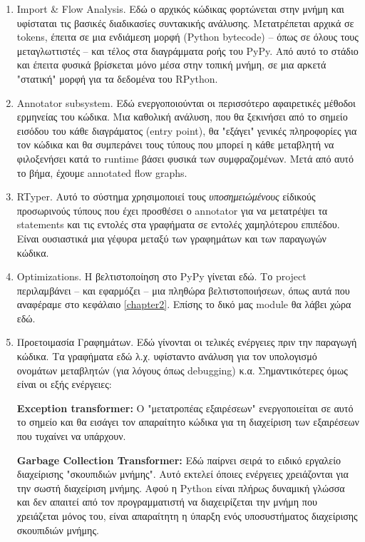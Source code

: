 \begin{enumerate}

\item Import \& Flow Analysis. Εδώ ο αρχικός κώδικας φορτώνεται στην μνήμη και
υφίσταται τις βασικές διαδικασίες συντακικής ανάλυσης. Μετατρέπεται αρχικά σε
tokens, έπειτα σε μια ενδιάμεση μορφή (Python bytecode) – όπως σε όλους τους
μεταγλωττιστές – και τέλος στα διαγράμματα ροής του PyPy. Από αυτό το στάδιο και
έπειτα φυσικά βρίσκεται μόνο μέσα στην τοπική μνήμη, σε μια αρκετά "στατική"
μορφή για τα δεδομένα του RPython.

\item Annotator subsystem. Εδώ ενεργοποιούνται οι περισσότερο αφαιρετικές
μέθοδοι ερμηνείας του κώδικα. Μια καθολική ανάλυση, που θα ξεκινήσει από το
σημείο εισόδου του κάθε διαγράματος (entry point), θα "εξάγει" γενικές
πληροφορίες για τον κώδικα και θα συμπεράνει τους τύπους που μπορεί η κάθε
μεταβλητή να φιλοξενήσει κατά το runtime βάσει φυσικά των συμφραζομένων. Μετά
από αυτό το βήμα, έχουμε annotated flow graphs.

\item RTyper. Αυτό το σύστημα χρησιμοποιεί τους \textit{υποσημειώμένους}
είδικούς προσωρινούς τύπους που έχει προσθέσει ο annotator για να μετατρέψει τα
statements και τις εντολές στα γραφήματα σε εντολές χαμηλότερου επιπέδου. Είναι
ουσιαστικά μια γέφυρα μεταξύ των γραφημάτων και των παραγωγών κώδικα.

\item Optimizations. Η βελτιστοποίηση στο PyPy γίνεται εδώ. Το project
περιλαμβάνει – και εφαρμόζει –  μια πληθώρα βελτιστοποιήσεων, όπως αυτά που
αναφέραμε στο κεφάλαιο \ref{chapter2}. Επίσης το δικό μας module θα λάβει χώρα
εδώ.

\item Προετοιμασία Γραφημάτων. Εδώ γίνονται οι τελικές ενέργειες πριν την
παραγωγή κώδικα. Τα γραφήματα εδώ λ.χ. υφίσταντο ανάλυση για τον υπολογισμό
ονομάτων μεταβλητών (για λόγους όπως debugging) κ.α. Σημαντικότερες όμως είναι
οι εξής ενέργειες:

\textbf{Exception transformer:} Ο "μετατροπέας εξαιρέσεων" ενεργοποιείται σε
αυτό το σημείο και θα εισάγει τον απαραίτητο κώδικα για τη διαχείριση των
εξαιρέσεων που τυχαίνει να υπάρχουν.

\textbf{Garbage Collection Transformer:} Εδώ παίρνει σειρά το ειδικό εργαλείο
διαχείρισης "σκουπιδιών μνήμης". Αυτό εκτελεί όποιες ενέργειες χρειάζονται για
την σωστή διαχείριση μνήμης. Αφού η Python είναι πλήρως δυναμική γλώσσα και δεν
απαιτεί από τον προγραμματιστή να διαχειρίζεται την μνήμη που χρειάζεται μόνος
του, είναι απαραίτητη η ύπαρξη ενός υποσυστήματος διαχείρισης σκουπιδιών μνήμης.


\end{enumerate}
